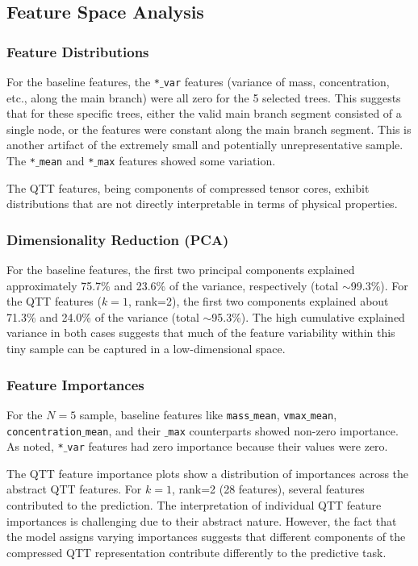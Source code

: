 \documentclass[twocolumn]{aastex631}
\begin{document}
\subsection{Feature Space Analysis}

\subsubsection{Feature Distributions}
For the baseline features, the \texttt{*\ensuremath{\_}var} features (variance of mass, concentration, etc., along the main branch) were all zero for the 5 selected trees. This suggests that for these specific trees, either the valid main branch segment consisted of a single node, or the features were constant along the main branch segment. This is another artifact of the extremely small and potentially unrepresentative sample. The \texttt{*\ensuremath{\_}mean} and \texttt{*\ensuremath{\_}max} features showed some variation.

The QTT features, being components of compressed tensor cores, exhibit distributions that are not directly interpretable in terms of physical properties.

\subsubsection{Dimensionality Reduction (PCA)}
For the baseline features, the first two principal components explained approximately 75.7\% and 23.6\% of the variance, respectively (total $\sim$99.3\%). For the QTT features ($k=1$, rank=2), the first two components explained about 71.3\% and 24.0\% of the variance (total $\sim$95.3\%). The high cumulative explained variance in both cases suggests that much of the feature variability within this tiny sample can be captured in a low-dimensional space.

\subsubsection{Feature Importances}
For the $N=5$ sample, baseline features like \texttt{mass\ensuremath{\_}mean}, \texttt{vmax\ensuremath{\_}mean}, \texttt{concentration\ensuremath{\_}mean}, and their \texttt{\ensuremath{\_}max} counterparts showed non-zero importance. As noted, \texttt{*\ensuremath{\_}var} features had zero importance because their values were zero.

The QTT feature importance plots show a distribution of importances across the abstract QTT features. For $k=1$, rank=2 (28 features), several features contributed to the prediction. The interpretation of individual QTT feature importances is challenging due to their abstract nature. However, the fact that the model assigns varying importances suggests that different components of the compressed QTT representation contribute differently to the predictive task.
\end{document}
